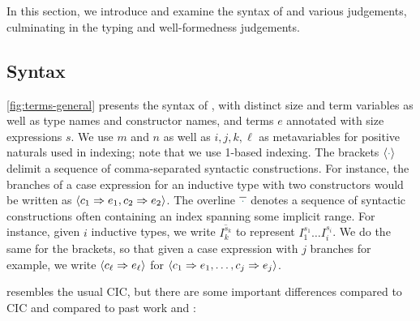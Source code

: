 \section{\titlelang}\label{sec:typing}
In this section, we introduce and examine the syntax of \lang and various judgements,
culminating in the typing and well-formedness judgements.

\subsection{Syntax}




\autoref{fig:terms-general} presents the syntax of \lang,
with distinct size and term variables as well as \coinductive type names and \coinductive constructor names,
and terms $e$ annotated with size expressions $s$.
We use $m$ and $n$ as well as $i, j, k, \ell$ as metavariables for positive naturals used in indexing; note that we use 1-based indexing.
The brackets $\seq{\ph}$ delimit a sequence of comma-separated syntactic constructions.
For instance, the branches of a case expression for an inductive type with two constructors would be written as $\langle c_1 \Rightarrow e_1, c_2 \Rightarrow e_2\rangle$.
The overline $\overline{\,\ph\,}$ denotes a sequence of syntactic constructions often containing an index spanning some implicit range.
For instance, given $i$ inductive types, we write $\overline{I^{s_k}_k}$ to represent $I^{s_1}_1 \dots I^{s_i}_i$.
We do the same for the brackets, so that given a case expression with $j$ branches for example, we write $\langle c_\ell \Rightarrow e_\ell\rangle$ for $\langle c_1 \Rightarrow e_1, \dots, c_j \Rightarrow e_j\rangle$.


\lang resembles the usual CIC, but there are some important differences compared to CIC and compared to past work \CIChat and \CIChatminus:

